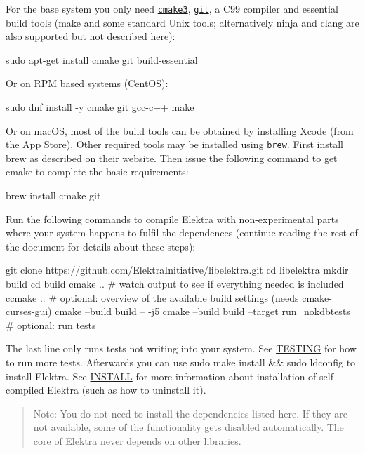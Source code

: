 For the base system you only need \href{https://cmake.org/cmake/help/v3.0/}{\tt cmake3}, \href{https://git-scm.com/}{\tt git}, a C99 compiler and essential build tools (make and some standard Unix tools; alternatively ninja and clang are also supported but not described here)\+:


\begin{DoxyCode}
sudo apt-get install cmake git build-essential
\end{DoxyCode}


Or on R\+PM based systems (Cent\+OS)\+:


\begin{DoxyCode}
sudo dnf install -y cmake git gcc-c++ make
\end{DoxyCode}


Or on mac\+OS, most of the build tools can be obtained by installing Xcode (from the App Store). Other required tools may be installed using \href{http://brew.sh/}{\tt brew}. First install brew as described on their website. Then issue the following command to get cmake to complete the basic requirements\+:


\begin{DoxyCode}
brew install cmake git
\end{DoxyCode}


Run the following commands to compile Elektra with non-\/experimental parts where your system happens to fulfil the dependences (continue reading the rest of the document for details about these steps)\+:


\begin{DoxyCode}
git clone https://github.com/ElektraInitiative/libelektra.git
cd libelektra
mkdir build
cd build
cmake ..  # watch output to see if everything needed is included
ccmake .. # optional: overview of the available build settings (needs cmake-curses-gui)
cmake --build build -- -j5
cmake --build build --target run\_nokdbtests # optional: run tests
\end{DoxyCode}


The last line only runs tests not writing into your system. See \hyperlink{doc_TESTING_md}{T\+E\+S\+T\+I\+NG} for how to run more tests. Afterwards you can use {\ttfamily sudo make install \&\& sudo ldconfig} to install Elektra. See \hyperlink{doc_INSTALL_md}{I\+N\+S\+T\+A\+LL} for more information about installation of self-\/compiled Elektra (such as how to uninstall it).

\begin{quote}
Note\+: You do not need to install the dependencies listed here. If they are not available, some of the functionality gets disabled automatically. The core of Elektra never depends on other libraries. \end{quote}


